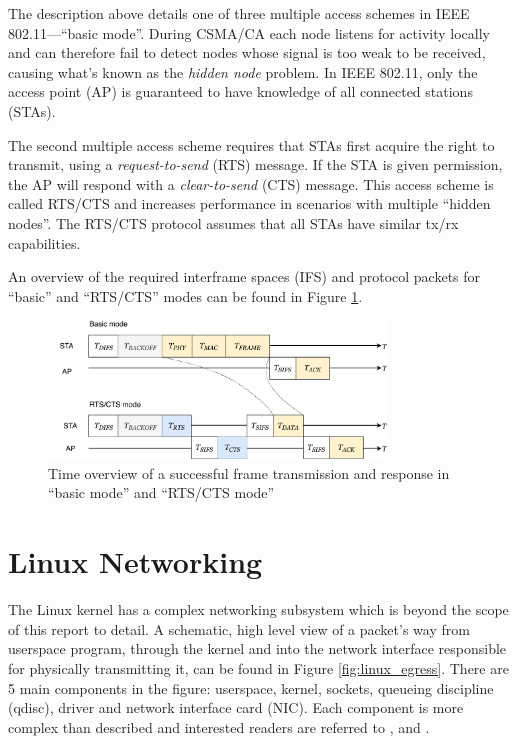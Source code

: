 The description above details one of three multiple access schemes in IEEE
802.11—``basic mode''. During CSMA/CA each node listens for activity locally
and can therefore fail to detect nodes whose signal is too weak to be
received, causing what's known as the \emph{hidden node} problem. In IEEE
802.11, only the access point (AP) is guaranteed to have knowledge of all
connected stations (STAs). 

The second multiple access scheme requires that STAs first acquire the right
to transmit, using a \emph{request-to-send} (RTS) message. If the STA is given
permission, the AP will respond with a \emph{clear-to-send} (CTS) message.
This access scheme is called RTS/CTS and increases performance in scenarios
with multiple ``hidden nodes''. The RTS/CTS protocol assumes that all STAs 
have similar tx/rx capabilities.

An overview of the required interframe spaces (IFS) and protocol packets for 
``basic'' and ``RTS/CTS'' modes can be found in Figure \ref{fig:timings}. 

\begin{figure}
\center
\includegraphics[width=0.8\textwidth]{images/time-overview.pdf}
\caption{Time overview of a successful frame transmission and response in ``basic mode'' and ``RTS/CTS mode''}
\label{fig:timings}
\end{figure}


\section{Linux Networking}

The Linux kernel has a complex networking subsystem which is beyond the scope
of this report to detail. A schematic, high level view of a packet's way from 
userspace program, through the kernel and into the network interface responsible 
for physically transmitting it, can be found in Figure \ref{fig:linux_egress}. 
There are 5 main components in the figure: userspace, kernel, sockets, queueing 
discipline (qdisc), driver and network interface card (NIC). Each component is
more complex than described and interested readers are referred to \cite{knet},
\cite{pcsending} and \cite[Chapter~17]{ldd}.

